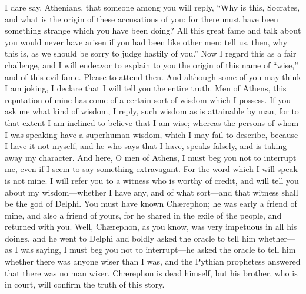 \documentclass[12pt]{article}
\begin{document}
I dare say, Athenians, that someone among you will reply, ``Why is
this, Socrates, and what is the origin of these accusations of you:
for there must have been something strange which you have been doing?
All this great fame and talk about you would never have arisen if
you had been like other men: tell us, then, why this is, as we should
be sorry to judge hastily of you.'' Now I regard this as a fair challenge,
and I will endeavor to explain to you the origin of this name of ``wise,''
and of this evil fame. Please to attend then. And although some of
you may think I am joking, I declare that I will tell you the entire
truth. Men of Athens, this reputation of mine has come of a certain
sort of wisdom which I possess. If you ask me what kind of wisdom,
I reply, such wisdom as is attainable by man, for to that extent I
am inclined to believe that I am wise; whereas the persons of whom
I was speaking have a superhuman wisdom, which I may fail to describe,
because I have it not myself; and he who says that I have, speaks
falsely, and is taking away my character. And here, O men of Athens,
I must beg you not to interrupt me, even if I seem to say something
extravagant. For the word which I will speak is not mine. I will refer
you to a witness who is worthy of credit, and will tell you about
my wisdom---whether I have any, and of what sort---and that witness
shall be the god of Delphi. You must have known Ch{\ae}rephon; he was
early a friend of mine, and also a friend of yours, for he shared
in the exile of the people, and returned with you. Well, Ch{\ae}rephon,
as you know, was very impetuous in all his doings, and he went to
Delphi and boldly asked the oracle to tell him whether---as I was
saying, I must beg you not to interrupt---he asked the oracle to tell
him whether there was anyone wiser than I was, and the Pythian prophetess
answered that there was no man wiser. Ch{\ae}rephon is dead himself,
but his brother, who is in court, will confirm the truth of this story.
\end{document}
